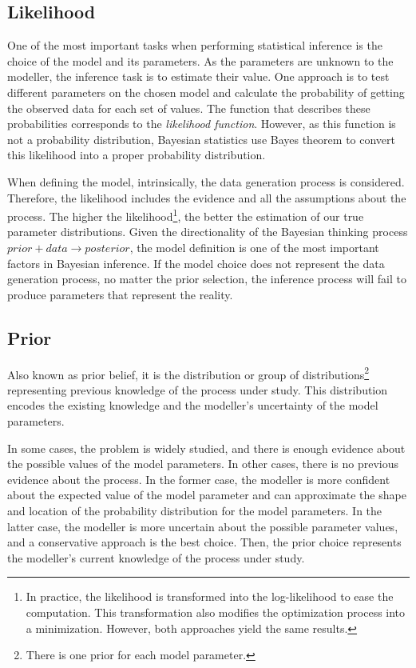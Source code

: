 \subsection{Likelihood} 

One of the most important tasks when performing statistical inference is the choice of the model and its parameters. As the parameters are unknown to the modeller, the inference task is to estimate their value. One approach is to test different parameters on the chosen model and calculate the probability of getting the observed data for each set of values. The function that describes these probabilities corresponds to the \textit{likelihood function}. However, as this function is not a probability distribution, Bayesian statistics use Bayes theorem to convert this likelihood into a proper probability distribution. 

When defining the model, intrinsically, the data generation process is considered. Therefore, the likelihood includes the evidence and all the assumptions about the process. The higher the likelihood\footnote{In practice, the likelihood is transformed into the log-likelihood to ease the computation. This transformation also modifies the optimization process into a minimization. However, both approaches yield the same results.}, the better the estimation of our true parameter distributions. Given the directionality of the Bayesian thinking process $prior+data\rightarrow posterior$, the model definition is one of the most important factors in Bayesian inference. If the model choice does not represent the data generation process, no matter the prior selection, the inference process will fail to produce parameters that represent the reality. 

\subsection{Prior }

Also known as prior belief, it is the distribution or group of distributions\footnote{There is one prior for each model parameter.} representing previous knowledge of the process under study. This distribution encodes the existing knowledge and the modeller's uncertainty of the model parameters. 

In some cases, the problem is widely studied, and there is enough evidence about the possible values of the model parameters. In other cases, there is no previous evidence about the process. In the former case, the modeller is more confident about the expected value of the model parameter and can approximate the shape and location of the probability distribution for the model parameters. In the latter case, the modeller is more uncertain about the possible parameter values, and a conservative approach is the best choice. Then, the prior choice represents the modeller's current knowledge of the process under study.

